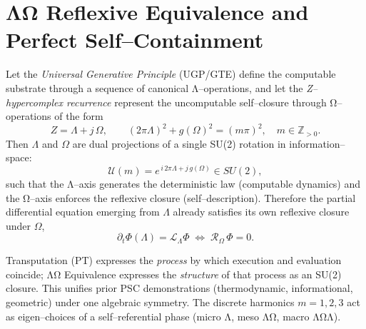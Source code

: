 \section{ΛΩ Reflexive Equivalence and Perfect Self–Containment}

\begin{theorem}
\label{thm:LambdaOmegaEquivalence}
Let the \emph{Universal Generative Principle} (UGP/GTE) define the computable substrate 
through a sequence of canonical Λ–operations, and let the \emph{Z–hypercomplex recurrence}
represent the uncomputable self–closure through Ω–operations of the form
\[
Z = \Lambda + j\,\Omega, \qquad (2\pi\Lambda)^2 + g(\Omega)^2 = (m\pi)^2,\quad m\in\mathbb{Z}_{>0}.
\]
Then $\Lambda$ and $\Omega$ are dual projections of a single SU(2) rotation in information–space:
\[
\mathcal{U}(m) = e^{\,i\,2\pi\Lambda + j\,g(\Omega)} \in SU(2),
\]
such that the Λ–axis generates the deterministic law (computable dynamics) 
and the Ω–axis enforces the reflexive closure (self–description).
Therefore the partial differential equation emerging from $\Lambda$
already satisfies its own reflexive closure under $\Omega$,
\[
\partial_t \Phi(\Lambda) = \mathcal{L}_{\Lambda}\Phi 
\;\Longleftrightarrow\;
\mathcal{R}_{\Omega}\,\Phi = 0.
\]
\end{theorem}

\begin{remark}
\label{rem:TransputationRelation}
Transputation (PT) expresses the \emph{process} by which execution and evaluation coincide;
ΛΩ Equivalence expresses the \emph{structure} of that process as an SU(2) closure.
This unifies prior PSC demonstrations (thermodynamic, informational, geometric) under one algebraic symmetry.
The discrete harmonics $m=1,2,3$ act as eigen–choices of a self–referential phase (micro Λ, meso ΛΩ, macro ΛΩΛ). 
\end{remark}
